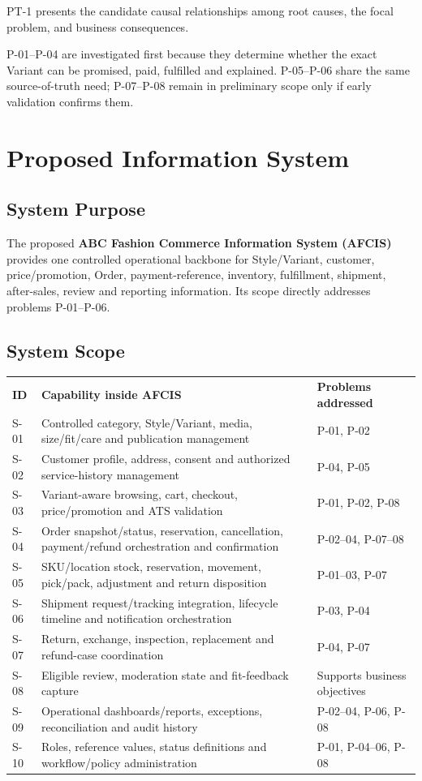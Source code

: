 \documentclass[10pt,a4paper]{article}
\newcommand{\keyterm}[1]{\textbf{#1}}
\begin{document}
PT-1 presents the candidate causal relationships among root causes, the focal problem, and business consequences.

P-01--P-04 are investigated first because they determine whether the exact Variant can be promised, paid, fulfilled and explained. P-05--P-06 share the same source-of-truth need; P-07--P-08 remain in preliminary scope only if early validation confirms them.
\newpage

\section{Proposed Information System}
\subsection{System Purpose}
The proposed \keyterm{ABC Fashion Commerce Information System (AFCIS)} provides one controlled operational backbone for Style/Variant, customer, price/promotion, Order, payment-reference, inventory, fulfillment, shipment, after-sales, review and reporting information. Its scope directly addresses problems P-01--P-06.

\subsection{System Scope}
\begin{tabularx}{\textwidth}{L{12mm}Y L{36mm}}
\textbf{ID} & \textbf{Capability inside AFCIS} & \textbf{Problems addressed}\\
S-01 & Controlled category, Style/Variant, media, size/fit/care and publication management & P-01, P-02\\
S-02 & Customer profile, address, consent and authorized service-history management & P-04, P-05\\
S-03 & Variant-aware browsing, cart, checkout, price/promotion and ATS validation & P-01, P-02, P-08\\
S-04 & Order snapshot/status, reservation, cancellation, payment/refund orchestration and confirmation & P-02--04, P-07--08\\
S-05 & SKU/location stock, reservation, movement, pick/pack, adjustment and return disposition & P-01--03, P-07\\
S-06 & Shipment request/tracking integration, lifecycle timeline and notification orchestration & P-03, P-04\\
S-07 & Return, exchange, inspection, replacement and refund-case coordination & P-04, P-07\\
S-08 & Eligible review, moderation state and fit-feedback capture & Supports business objectives\\
S-09 & Operational dashboards/reports, exceptions, reconciliation and audit history & P-02--04, P-06, P-08\\
S-10 & Roles, reference values, status definitions and workflow/policy administration & P-01, P-04--06, P-08\\
\end{tabularx}
\end{document}
